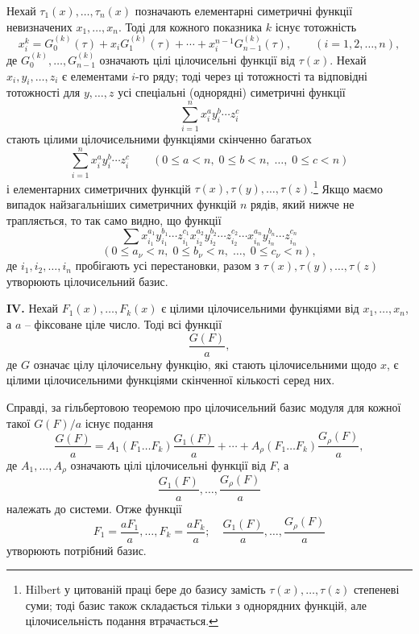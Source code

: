 \documentclass[11pt]{article}
\begin{document}
Нехай \(\tau_1(x),\ldots,\tau_n(x)\) позначають елементарні симетричні функції невизначених \(x_1,\ldots,x_n\). Тоді для кожного показника \(k\) існує тотожність
\[
        x_i^k = G_0^{(k)}(\tau)+x_iG_1^{(k)}(\tau)+\cdots+x_i^{n-1}G_{n-1}^{(k)}(\tau),
        \qquad (i=1,2,\ldots,n),
\]
де \(G_0^{(k)},\ldots,G_{n-1}^{(k)}\) означають цілі цілочисельні функції від \(\tau(x)\). Нехай \(x_i,y_i,\ldots,z_i\) є елементами \(i\)-го ряду; тоді через ці тотожності та відповідні тотожності для \(y,\ldots,z\) усі спеціальні (однорядні) симетричні функції
\[
        \sum_{i=1}^n x_i^{a}y_i^{b}\cdots z_i^{c}
\]
стають цілими цілочисельними функціями скінченно багатьох
\[
        \sum_{i=1}^n x_i^{a}y_i^{b}\cdots z_i^{c}
        \qquad
        (0\le a<n,\;0\le b<n,\;\ldots,\;0\le c<n)
\]
і елементарних симетричних функцій \(\tau(x),\tau(y),\ldots,\tau(z)\).\footnote{Hilbert у цитованій праці бере до базису замість \(\tau(x),\ldots,\tau(z)\) степеневі суми; тоді базис також складається тільки з однорядних функцій, але цілочисельність подання втрачається.}
Якщо маємо випадок найзагальніших симетричних функцій \(n\) рядів, який нижче не трапляється, то так само видно, що функції
\[
        \sum x_{i_1}^{a_1}y_{i_1}^{b_1}\cdots z_{i_1}^{c_1}
              x_{i_2}^{a_2}y_{i_2}^{b_2}\cdots z_{i_2}^{c_2}
              \cdots
              x_{i_n}^{a_n}y_{i_n}^{b_n}\cdots z_{i_n}^{c_n}
\]
\[
        (0\le a_\nu<n,\;0\le b_\nu<n,\;\ldots,\;0\le c_\nu<n),
\]
де \(i_1,i_2,\ldots,i_n\) пробігають усі перестановки, разом з \(\tau(x),\tau(y),\ldots,\tau(z)\) утворюють цілочисельний базис.

\textbf{IV.} Нехай \(F_1(x),\ldots,F_k(x)\) є цілими цілочисельними функціями від \(x_1,\ldots,x_n\), а \(a\) -- фіксоване ціле число. Тоді всі функції
\[
        \frac{G(F)}{a},
\]
де \(G\) означає цілу цілочисельну функцію, які стають цілочисельними щодо \(x\), є цілими цілочисельними функціями скінченної кількості серед них.

Справді, за гільбертовою теоремою про цілочисельний базис модуля для кожної такої \(G(F)/a\) існує подання
\[
 \frac{G(F)}{a}
 =
 A_1(F_1\ldots F_k)\frac{G_1(F)}{a}
 +\cdots+
 A_\rho(F_1\ldots F_k)\frac{G_\rho(F)}{a},
\]
де \(A_1,\ldots,A_\rho\) означають цілі цілочисельні функції від \(F\), а
\[
        \frac{G_1(F)}{a},\ldots,\frac{G_\rho(F)}{a}
\]
належать до системи. Отже функції
\[
        F_1=\frac{aF_1}{a},\ldots,F_k=\frac{aF_k}{a};
        \quad
        \frac{G_1(F)}{a},\ldots,\frac{G_\rho(F)}{a}
\]
утворюють потрібний базис.

\setcounter{equation}{0}
\end{document}
